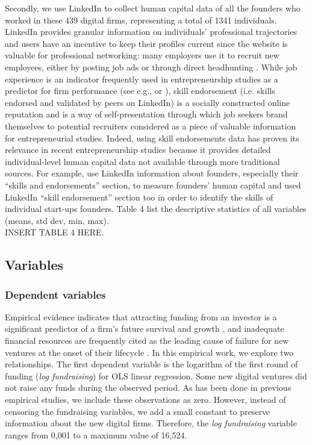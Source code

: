 \documentclass[12pt]{article}
\begin{document}
Secondly, we use LinkedIn to collect human capital data of all the founders who worked in these 439 digital firms, representing a total of 1341 individuals. LinkedIn provides granular information on individuals’ professional trajectories and users have an incentive to keep their profiles current since the website is valuable for professional networking: many employers use it to recruit new employees, either by posting job ads or through direct headhunting \citep{perez2016endorsement, rapanta2017linkedin, wu2018analysis}. While job experience is an indicator frequently used in entrepreneurship studies as a predictor for firm performance (see e.g., \citet{colombo2005founders} or \citet{delmar2006does}), skill endorsement (i.e. skills endorsed and validated by peers on LinkedIn) is a socially constructed online reputation and is a way of self-presentation through which job seekers brand themselves to potential recruiters \citep{rapanta2017linkedin} considered as a piece of valuable information for entrepreneurial studies. Indeed, using skill endorsements data has proven its relevance in recent entrepreneurship studies because it provides detailed individual-level human capital data not available through more traditional sources. For example, \citet{reese2020should} use LinkedIn information about founders, especially their “skills and endorsements” section, to measure founders’ human capital and \citet{sako2020scaling} used LinkedIn “skill endorsement” section too in order to identify the skills of individual start-ups founders. Table 4\label{table4} list the descriptive statistics of all variables (means, std dev, min, max). \\

INSERT TABLE 4 HERE.

\subsection{Variables}

\subsubsection{Dependent variables}

Empirical evidence indicates that attracting funding from an investor is a significant predictor of a firm's future survival and growth \citep{beckman2007early}, and inadequate financial resources are frequently cited as the leading cause of failure for new ventures at the onset of their lifecycle \citep{franke2008venture, eddleston2016you}. In this empirical work, we explore two relationships. The first dependent variable is the logarithm of the first round of funding (\textit{log fundraising}) for OLS linear regression. Some new digital ventures did not raise any funds during the observed period. As has been done in previous empirical studies, we include these observations as zero. However, instead of censoring the fundraising variables, we add a small constant to preserve information about the new digital firms. Therefore, the \textit{log fundraising} variable ranges from 0,001 to a maximum value of 16,524. \\
\end{document}
